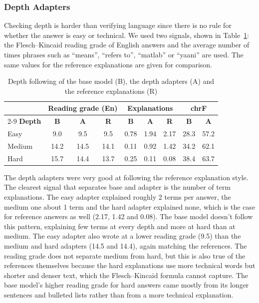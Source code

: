 \documentclass{FastFyp}
\begin{document}
\subsubsection{Depth Adapters}
Checking depth is harder than verifying language since there is no rule for whether the answer is easy or technical. We used two signals, shown in Table~\ref{tab:depth-following}: the Flesch--Kincaid reading grade of English answers and the average number of times phrases such as ``means'', ``refers to'', ``matlab'' or ``yaani'' are used. The same values for the reference explanations are given for comparison.

\begin{table}[H]
\centering
\caption{Depth following of the base model (B), the depth adapters (A) and the reference explanations (R)}
\label{tab:depth-following}
\small
\begin{tabular}{|l|c|c|c|c|c|c|c|c|}
\hline
 & \multicolumn{3}{c|}{\textbf{Reading grade (En)}} & \multicolumn{3}{c|}{\textbf{Explanations}} & \multicolumn{2}{c|}{\textbf{chrF}} \\ \cline{2-9}
\textbf{Depth} & \textbf{B} & \textbf{A} & \textbf{R} & \textbf{B} & \textbf{A} & \textbf{R} & \textbf{B} & \textbf{A} \\ \hline
Easy   & 9.0  & 9.5  & 9.5  & 0.78 & 1.94 & 2.17 & 28.3 & 57.2 \\ \hline
Medium & 14.2 & 14.5 & 14.1 & 0.11 & 0.92 & 1.42 & 34.2 & 62.1 \\ \hline
Hard   & 15.7 & 14.4 & 13.7 & 0.25 & 0.11 & 0.08 & 38.4 & 63.7 \\ \hline
\end{tabular}
\end{table}

The depth adapters were very good at following the reference explanation style. The clearest signal that separates base and adapter is the number of term explanations. The easy adapter explained roughly 2 terms per answer, the medium one about 1 term and the hard adapter explained none, which is the case for reference answers as well (2.17, 1.42 and 0.08). The base model doesn't follow this pattern, explaining few terms at every depth and more at hard than at medium. The easy adapter also wrote at a lower reading grade (9.5) than the medium and hard adapters (14.5 and 14.4), again matching the references. The reading grade does not separate medium from hard, but this is also true of the references themselves because the hard explanations use more technical words but shorter and denser text, which the Flesch--Kincaid formula cannot capture. The base model's higher reading grade for hard answers came mostly from its longer sentences and bulleted lists rather than from a more technical explanation.
\end{document}
